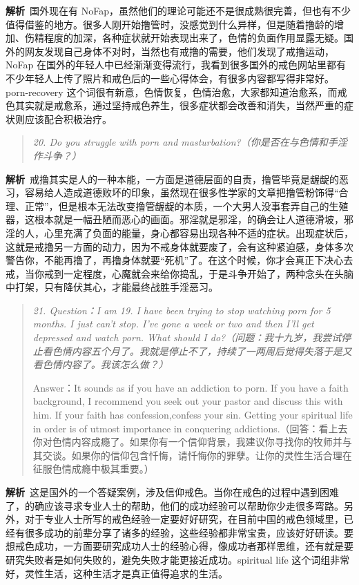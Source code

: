\textbf{解析}\ 国外现在有 NoFap，虽然他们的理论可能还不是很成熟很完善，但也有不少值得借鉴的地方。很多人刚开始撸管时，没感觉到什么异样，但是随着撸龄的增加、伤精程度的加深，各种症状就开始表现出来了，色情的负面作用显露无疑。国外的网友发现自己身体不对时，当然也有戒撸的需要，他们发现了戒撸运动，NoFap 在国外的年轻人中已经渐渐变得流行，我看到很多国外的戒色网站里都有不少年轻人上传了照片和戒色后的一些心得体会，有很多内容都写得非常好。porn-recovery 这个词很有新意，色情恢复，色情治愈，大家都知道治愈系，而戒色其实就是戒愈系，通过坚持戒色养生，很多症状都会改善和消失，当然严重的症状则应该配合积极治疗。

\begin{quote}\it
    20. Do you struggle with porn and masturbation?（你是否在与色情和手淫作斗争？）
\end{quote}

\textbf{解析}\ 戒撸其实是人的一种本能，一方面是道德层面的自责，撸管毕竟是龌龊的恶习，容易给人造成道德败坏的印象，虽然现在很多性学家的文章把撸管粉饰得“合理、正常”，但是根本无法改变撸管龌龊的本质，一个大男人没事套弄自己的生殖器，这根本就是一幅丑陋而恶心的画面。邪淫就是邪淫，的确会让人道德滑坡，邪淫的人，心里充满了负面的能量，身心都容易出现各种不适的症状。出现症状后，这就是戒撸另一方面的动力，因为不戒身体就要废了，会有这种紧迫感，身体多次警告你，不能再撸了，再撸身体就要“死机”了。在这个时候，你才会真正下决心去戒，当你戒到一定程度，心魔就会来给你捣乱，于是斗争开始了，两种念头在头脑中打架，只有降伏其心，才能最终战胜手淫恶习。

\begin{quote}\it
    21. Question：I am 19. I have been trying to stop watching porn for 5 months. I just can't stop. I've gone a week or two and then I'll get depressed and watch porn. What should I do?（问题：我十九岁，我尝试停止看色情内容五个月了。我就是停止不了，持续了一两周后觉得失落于是又看色情内容了。我该怎么做？）

    Answer：It sounds as if you have an addiction to porn. If you have a faith background, I recommend you seek out your pastor and discuss this with him. If your faith has confession,confess your sin. Getting your spiritual life in order is of utmost importance in conquering addictions.（回答：看上去你对色情内容成瘾了。如果你有一个信仰背景，我建议你寻找你的牧师并与其交谈。如果你的信仰包含忏悔，请忏悔你的罪孽。让你的灵性生活合理在征服色情成瘾中极其重要。）
\end{quote}

\textbf{解析}\ 这是国外的一个答疑案例，涉及信仰戒色。当你在戒色的过程中遇到困难了，的确应该寻求专业人士的帮助，他们的成功经验可以帮助你少走很多弯路。另外，对于专业人士所写的戒色经验一定要好好研究，在目前中国的戒色领域里，已经有很多成功的前辈分享了诸多的经验，这些经验都非常宝贵，应该好好研读。要想戒色成功，一方面要研究成功人士的经验心得，像成功者那样思维，还有就是要研究失败者是如何失败的，避免失败才能更接近成功。spiritual life 这个词组非常好，灵性生活，这种生活才是真正值得追求的生活。

